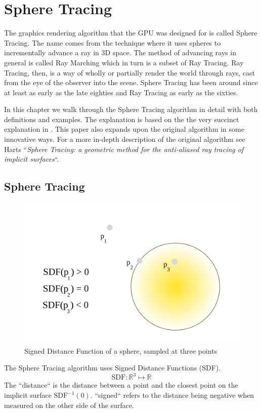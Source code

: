\chapter{Sphere Tracing} \label{spheretracing}

	The graphics rendering algorithm that the GPU was designed for is called
	Sphere Tracing\cite{Hart1996}. The name comes from the technique where it
	uses spheres to incrementally advance a ray in 3D space. The method of
	advancing rays in general is called Ray Marching which in turn is a subset
	of Ray Tracing\cite{Whitted1980a}. Ray Tracing, then, is a way of wholly or
	partially render the world through rays, cast from the eye of the observer
	into the scene. Sphere Tracing has been around since at least as early as
	the late eighties\cite{Hart1989} and Ray Tracing as early as the
	sixties\cite{Appel1968}.

	In this chapter we walk through the Sphere Tracing algorithm in detail with
	both definitions and examples. The explanation is based on the the very
	succinct explanation in \cite{Korndorfer2014}. This paper also expands upon
	the original algorithm in some innovative ways. For a more in-depth
	description of the original algorithm see Harts ``\emph{Sphere Tracing: a
	geometric method for the anti-aliased ray tracing of implicit
	surfaces}``\cite{Hart1996}.

	\section{Sphere Tracing} 

		\begin{figure}
			\includegraphics[width=0.75\linewidth]{figure/SDF} 
			\caption{Signed Distance Function of a sphere, sampled at three 
				points}
		\end{figure}

		The Sphere Tracing algorithm uses Signed Distance Functions (SDF).
		$$\text{SDF}:\mathbb{R}^{3}\mapsto\mathbb{R}$$ The ``distance`` is the
		distance between a point and the closest point on the implicit surface
		$\text{SDF}^{-1}(0)$. ``signed`` refers to the distance being negative
		when measured on the other side of the surface. 

